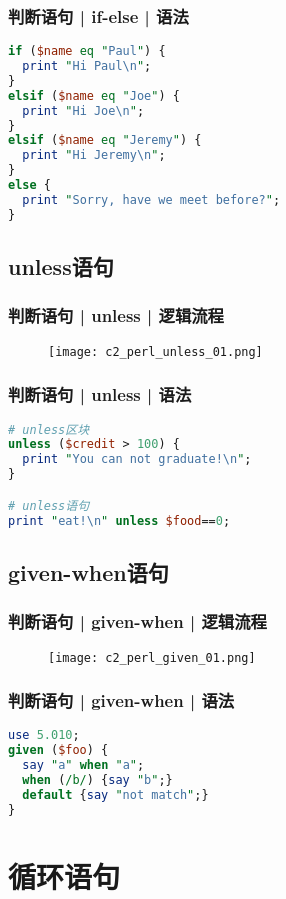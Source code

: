 \begin{frame}[fragile]
  \frametitle{判断语句 | if-else | \alert{语法}}
\begin{lstlisting}[language=Perl]
if ($name eq "Paul") {
  print "Hi Paul\n";
}
elsif ($name eq "Joe") {
  print "Hi Joe\n";
}
elsif ($name eq "Jeremy") {
  print "Hi Jeremy\n";
}
else {
  print "Sorry, have we meet before?";
}
\end{lstlisting}
\end{frame}

\subsection{unless语句}
\begin{frame}
  \frametitle{判断语句 | unless | 逻辑流程}
  \begin{figure}
    \centering
    \texttt{[image: c2\_perl\_unless\_01.png]}
  \end{figure}
\end{frame}

\begin{frame}[fragile]
  \frametitle{判断语句 | unless | \alert{语法}}
\begin{lstlisting}[language=Perl]
# unless区块
unless ($credit > 100) {
  print "You can not graduate!\n";
}

# unless语句
print "eat!\n" unless $food==0;
\end{lstlisting}
\end{frame}

\subsection{given-when语句}
\begin{frame}
  \frametitle{判断语句 | given-when | 逻辑流程}
  \begin{figure}
    \centering
    \texttt{[image: c2\_perl\_given\_01.png]}
  \end{figure}
\end{frame}

\begin{frame}[fragile]
  \frametitle{判断语句 | given-when | 语法}
\begin{lstlisting}[language=Perl]
use 5.010;
given ($foo) {
  say "a" when "a";
  when (/b/) {say "b";}
  default {say "not match";}
}
\end{lstlisting}
\end{frame}

\section{循环语句}
